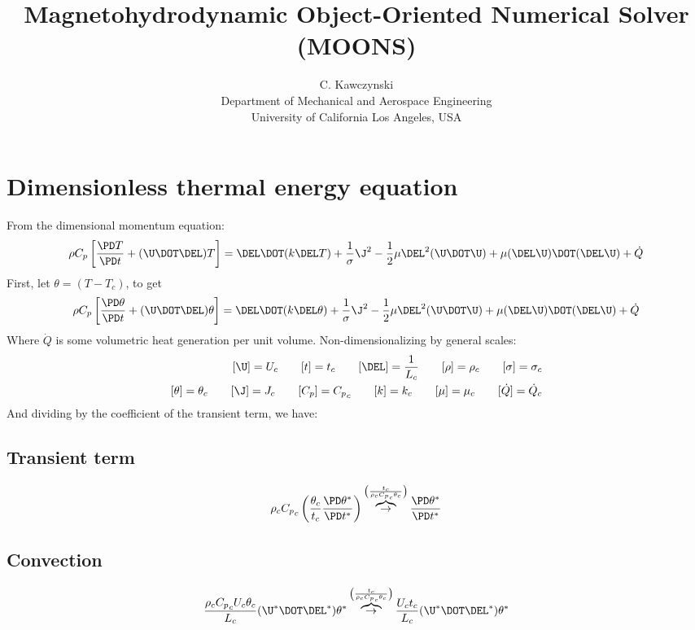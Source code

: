 \documentclass[11pt]{article}
\newcommand{\OB}{\overbrace{\rightarrow}^{\left(\frac{t_c}{\rho_c {C_p}_c \theta_c}\right)}}
\newcommand{\Cp}{{C_p}_c}
\begin{document}
\doublespacing
\title{Magnetohydrodynamic Object-Oriented Numerical Solver (MOONS)}
\author{C. Kawczynski \\
Department of Mechanical and Aerospace Engineering \\
University of California Los Angeles, USA\\
}
\maketitle

\section{Dimensionless thermal energy equation}
From the dimensional momentum equation:
\begin{equation}
	\rho C_p \left[ \frac{\PD T}{\PD t}
	+ (\U \DOT \DEL) T \right]
	= \DEL \DOT (k \DEL T)
	+ \frac{1}{\sigma} \J^2
	- \frac{1}{2} \mu \DEL^2 (\U \DOT \U)
	+ \mu (\DEL \U) \DOT (\DEL \U)
	+ \dot{Q}
\end{equation}
First, let $\theta = (T - T_c)$, to get
\begin{equation}
	\rho C_p \left[ \frac{\PD \theta}{\PD t}
	+ (\U \DOT \DEL) \theta \right]
	= \DEL \DOT (k \DEL \theta)
	+ \frac{1}{\sigma} \J^2
	- \frac{1}{2} \mu \DEL^2 (\U \DOT \U)
	+ \mu (\DEL \U) \DOT (\DEL \U)
	+ \dot{Q}
\end{equation}
Where $\dot{Q}$ is some volumetric heat generation per unit volume. Non-dimensionalizing by general scales:
\begin{equation}\begin{aligned}
	[\U] = U_c \qquad
	[t] = t_c \qquad
	[\DEL] = \frac{1}{L_c} \qquad
	[\rho] = \rho_c \qquad
	[\sigma] = \sigma_c \\
	[\theta] = \theta_c \qquad
	[\J] = J_c \qquad
	[C_p] = \Cp \qquad
	[k] = k_c \qquad
	[\mu] = \mu_c \qquad
	[\dot{Q}] = \dot{Q}_c
\end{aligned}\end{equation}
And dividing by the coefficient of the transient term, we have:
\subsection{Transient term}
\begin{equation}
	\rho_c \Cp \left( \frac{\theta_c}{t_c} \frac{\PD \theta^*}{\PD t^*} \right)
	\OB
	\frac{\PD \theta^*}{\PD t^*}
\end{equation}
\subsection{Convection}
\begin{equation}
	\frac{\rho_c \Cp U_c \theta_c}{L_c} (\U^* \DOT \DEL^*) \theta^*
	\OB
	\frac{U_c t_c}{L_c} (\U^* \DOT \DEL^*) \theta^*
\end{equation}
\end{document}
